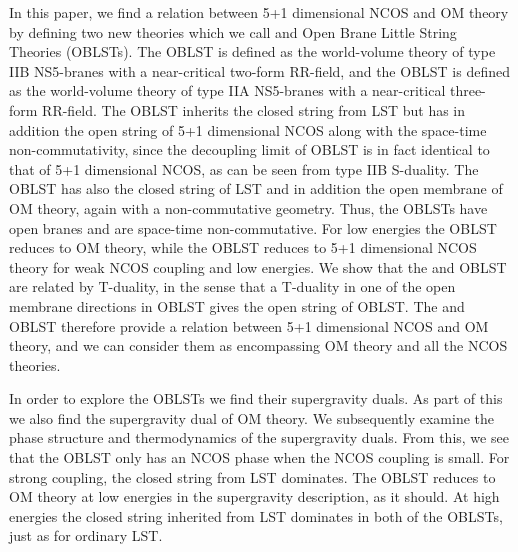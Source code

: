 \documentclass[a4paper,twoside,titlepage,12pt]{article}
\begin{document}
In this paper, we find a relation between 5+1 dimensional NCOS
and OM theory by defining two new theories which we call
\coordHE{} and \coordHE{} Open Brane Little String Theories (OBLSTs).
The \coordHE{} OBLST is defined as the world-volume theory
of \coordHE{} type IIB NS5-branes with a near-critical two-form RR-field,
and the \coordHE{} OBLST is defined as the world-volume theory
of \coordHE{} type IIA NS5-branes with a near-critical three-form RR-field.
The \coordHE{} OBLST inherits the closed string from \coordHE{} LST
but has in addition the open string of 5+1 dimensional NCOS
along with the space-time non-commutativity,
since the decoupling limit of \coordHE{} OBLST is in fact identical
to that of 5+1 dimensional NCOS, as can be seen from type IIB S-duality.
The \coordHE{} OBLST has also the closed string of \coordHE{} LST and
in addition the open membrane of OM theory, again with a
non-commutative geometry. 
Thus, the OBLSTs have open branes and are space-time non-commutative.
For low energies the \coordHE{} OBLST reduces to OM theory,
while the \coordHE{} OBLST reduces to 5+1 dimensional NCOS theory
for weak NCOS coupling and low energies.
We show that the \coordHE{} and \coordHE{} OBLST are related by T-duality,
in the sense that a T-duality in one of the open membrane directions
in \coordHE{} OBLST gives the open string of \coordHE{} OBLST.
The \coordHE{} and \coordHE{} OBLST therefore provide a
relation between 5+1 dimensional NCOS and OM theory, and
we can consider them as encompassing OM theory and all the NCOS theories.


In order to explore the OBLSTs we find their supergravity duals.
As part of this we also find the supergravity dual of OM theory.
We subsequently examine the phase structure and thermodynamics of 
the supergravity duals.
From this, we see that the \coordHE{} OBLST only has an NCOS phase
when the NCOS coupling is small. 
For strong coupling, the closed string from LST dominates.
The \coordHE{} OBLST reduces to OM theory at low energies
in the supergravity description, as it should.
At high energies the closed string inherited from
LST dominates in both of the OBLSTs, just as for ordinary LST.
\end{document}
